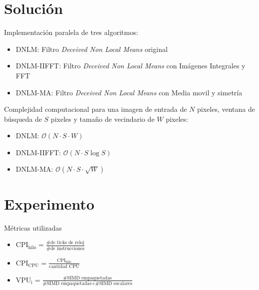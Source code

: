 \documentclass[15pt]{beamer} %
\begin{document}
\section{Solución}



\begin{frame}
	Implementaci\'on paralela de tres algoritmos:
	\begin{itemize}
	\item DNLM: Filtro \textit{Deceived Non Local Means} original
	\item DNLM-IIFFT: Filtro \textit{Deceived Non Local Means} con Im\'agenes Integrales y FFT
	\item DNLM-MA: Filtro \textit{Deceived Non Local Means} con Media movil y simetr\'ia
	\end{itemize}
	
	Complejidad computacional para una imagen de entrada de $N$ pixeles, ventana de b\'usqueda de $S$ pixeles y tama\~no de vecindario de $W$ pixeles:
	\begin{itemize}
	\item DNLM: $\mathcal{O}(N\cdot S\cdot W)$ 
	\item DNLM-IIFFT: $\mathcal{O}(N \cdot S\log S)$
	\item DNLM-MA: $\mathcal{O}(N\cdot S\cdot \sqrt{W})$
	\end{itemize}

\end{frame}



\section{Experimento}

\begin{frame}{Métricas utilizadas}
	\begin{itemize}
		\item $\text{CPI}_{\text{hilo}} = \frac{\text{\# de ticks de reloj}}{\# \text{de instrucciones}}$
		\vspace*{4mm}
		\item $\text{CPI}_{\text{CPU}} = \frac{\text{CPI}_{\text{hilo}}}{\text{cantidad CPU}}$
		\vspace*{4mm}
		\item $\text{VPU}_{\text{i}}= \frac{\text{\# SIMD empaquetadas}}{\text{\# SIMD empaquetadas}+\text{\# SIMD escalares}}$
	\end{itemize}	
\end{frame}
	
\end{document}
